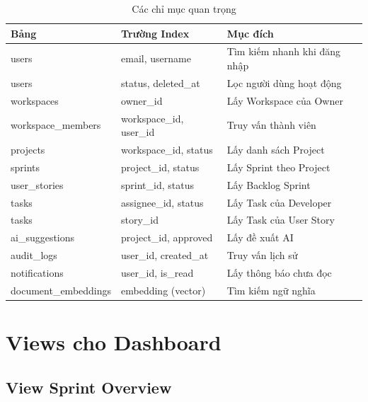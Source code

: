 \documentclass[12pt,a4paper]{report}
\begin{document}
\begin{table}[H]
\centering
\caption{Các chỉ mục quan trọng}
\begin{tabular}{|p{4cm}|p{4.5cm}|p{5cm}|}
\hline
\textbf{Bảng} & \textbf{Trường Index} & \textbf{Mục đích} \\
\hline
users & email, username & Tìm kiếm nhanh khi đăng nhập \\
\hline
users & status, deleted\_at & Lọc người dùng hoạt động \\
\hline
workspaces & owner\_id & Lấy Workspace của Owner \\
\hline
workspace\_members & workspace\_id, user\_id & Truy vấn thành viên \\
\hline
projects & workspace\_id, status & Lấy danh sách Project \\
\hline
sprints & project\_id, status & Lấy Sprint theo Project \\
\hline
user\_stories & sprint\_id, status & Lấy Backlog Sprint \\
\hline
tasks & assignee\_id, status & Lấy Task của Developer \\
\hline
tasks & story\_id & Lấy Task của User Story \\
\hline
ai\_suggestions & project\_id, approved & Lấy đề xuất AI \\
\hline
audit\_logs & user\_id, created\_at & Truy vấn lịch sử \\
\hline
notifications & user\_id, is\_read & Lấy thông báo chưa đọc \\
\hline
document\_embeddings & embedding (vector) & Tìm kiếm ngữ nghĩa \\
\hline
\end{tabular}
\label{tab:indexes}
\end{table}

\section{Views cho Dashboard}

\subsection{View Sprint Overview}
\end{document}
